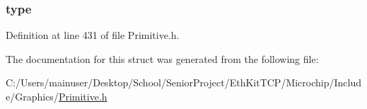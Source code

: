 \subsubsection[{type}]{ type}\label{struct_f_o_n_t___r_a_m_ad19c8e0d19c638be9dd81d163454b0f1}


Definition at line 431 of file Primitive.\+h.



The documentation for this struct was generated from the following file\+:\begin{DoxyCompactItemize}
\item 
C\+:/\+Users/mainuser/\+Desktop/\+School/\+Senior\+Project/\+Eth\+Kit\+T\+C\+P/\+Microchip/\+Include/\+Graphics/\hyperlink{_primitive_8h}{Primitive.\+h}\end{DoxyCompactItemize}
